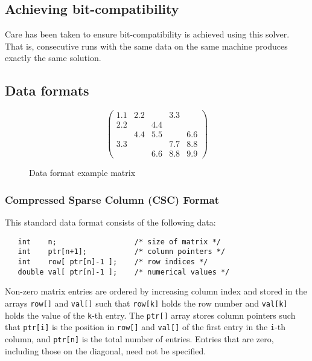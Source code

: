 \subsection{Achieving bit-compatibility} \label{ssids: bitcompat}
Care has been taken to ensure bit-compatibility is achieved using this solver.
That is, consecutive runs with the same data on the same machine  produces exactly
the same solution.

\subsection{Data formats} \label{ssids: dataformats}

\begin{figure}
   \caption{ \label{ssids: format eg}
      Data format example matrix
   }
   $$
      \left( \begin{array}{ccccc}
         1.1 & 2.2 &     & 3.3 &     \\
         2.2 &     & 4.4 &     &     \\
             & 4.4 & 5.5 &     & 6.6 \\
         3.3 &     &     & 7.7 & 8.8 \\
             &     & 6.6 & 8.8 & 9.9
      \end{array} \right)
   $$
\end{figure}

\subsubsection{Compressed Sparse Column (CSC) Format} \label{ssids: cscformat}
This standard data format consists of the following data:
\begin{verbatim}
   int    n;                  /* size of matrix */
   int    ptr[n+1];           /* column pointers */
   int    row[ ptr[n]-1 ];    /* row indices */
   double val[ ptr[n]-1 ];    /* numerical values */
\end{verbatim}
Non-zero matrix entries are ordered by increasing column index and stored in
the arrays \texttt{row[]} and \texttt{val[]} such that \texttt{row[k]} holds
the row number and \texttt{val[k]} holds the value of the \texttt{k}-th entry.
The \texttt{ptr[]} array stores column pointers such that \texttt{ptr[i]} is
the position in \texttt{row[]} and \texttt{val[]} of
the first entry in the \texttt{i}-th column, and \texttt{ptr[n]} is
the total number of entries.
Entries that are zero, including those on the diagonal, need not be specified.

